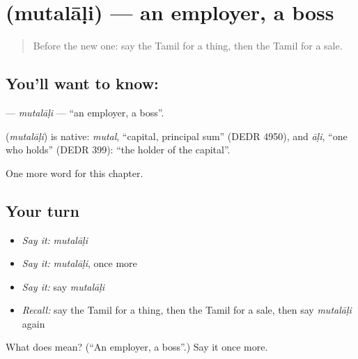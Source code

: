 \section[\texorpdfstring{\ta{முதலாளி} (mutalāḷi)}{முதலாளி (mutalāḷi)}]{ (mutalāḷi) — an employer, a boss}

\label{lesson:TA-C251-mutalali}



\begin{quote}
Before the new one: say the Tamil for a thing, then the Tamil for a sale.
\end{quote}

\subsection*{You'll want to know: }
\textbf{} — \emph{mutalāḷi} — \textquotedblleft{}an employer, a boss\textquotedblright{}.

\begin{cousinweb}
\textbf{} (\emph{mutalāḷi}) is native: \emph{mutal}, \textquotedblleft{}capital, principal sum\textquotedblright{} (DEDR 4950), and \emph{āḷi}, \textquotedblleft{}one who holds\textquotedblright{} (DEDR 399): \textquotedblleft{}the holder of the capital\textquotedblright{}.
\end{cousinweb}

\begin{grammarlens}[title={What you've built}]
One more word for this chapter.
\end{grammarlens}

\subsection*{Your turn}
\begin{itemize}
\raggedright
  \item \emph{Say it:} \emph{mutalāḷi}
  \item \emph{Say it:} \emph{mutalāḷi}, once more
  \item \emph{Say it:} say \emph{mutalāḷi}
  \item \emph{Recall:} say the Tamil for a thing, then the Tamil for a sale, then say \emph{mutalāḷi} again
\end{itemize}

\begin{tcolorbox}[breakable,colback=teal!4,colframe=teal!35!black,title={Before you move on}]
What does  mean? (\textquotedblleft{}An employer, a boss\textquotedblright{}.) Say it once more.
\end{tcolorbox}
